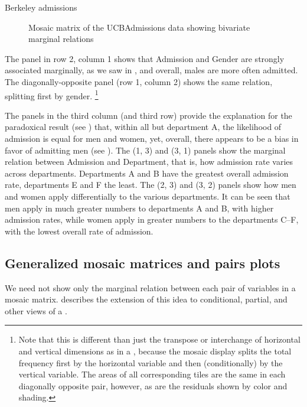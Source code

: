 \documentclass[10pt,krantz2]{krantz}\usepackage[]{graphicx}\usepackage[]{color}
\newenvironment{knitrout}{}{} %
\renewenvironment{knitrout}{\small\renewcommand{\baselinestretch}{.85}}{} %
\begin{document}
\begin{Example}[berkeley4]{Berkeley admissions}
\begin{knitrout}
\begin{figure}[!htb]
\caption[Mosaic matrix of the UCBAdmissions data showing bivariate marginal relations]{Mosaic matrix of the UCBAdmissions data showing bivariate marginal relations}\label{fig:berk-pairs1}
\end{figure}


\end{knitrout}
The panel in row 2, column 1
shows that Admission and Gender are
strongly associated marginally, as we saw in ,
and overall, males are more often admitted.
The diagonally-opposite panel (row 1, column 2) shows the
same relation, splitting first by gender.%
\footnote{Note that this is different than just the transpose or interchange
of horizontal and vertical dimensions as in a \scatmat,
because the mosaic display splits the total frequency first by the horizontal
variable and then (conditionally) by the vertical variable.
The areas of all corresponding tiles are the same in each diagonally
opposite pair, however, as are the
residuals shown by color and shading.}

The panels in the third column (and third row)
provide the explanation for the paradoxical
result (see ) that, within all but department A,
the likelihood of admission is equal for men and women,
yet, overall, there appears to be a bias in favor of admitting men
(see ).
The (1, 3) and (3, 1) panels show
the marginal relation between Admission and Department, that is,
how admission rate varies across departments.
Departments A and B have the greatest
overall admission rate, departments E and F the least.
The (2, 3) and (3, 2)
panels show how men and women apply differentially to
the various departments.
It can be seen that
men apply in much greater numbers to
departments A and B, with higher admission rates,
while women apply in greater numbers to
the departments C--F, with the lowest overall rate of admission.

\end{Example}

\subsection{Generalized mosaic matrices and pairs plots}\label{sec:condmat}

We need not show only the marginal relation between
each pair of variables in a mosaic matrix.
\citep{Friendly:99:EMD} describes the extension of this idea
to conditional, partial, and other views of a \ctab.
\end{document}
